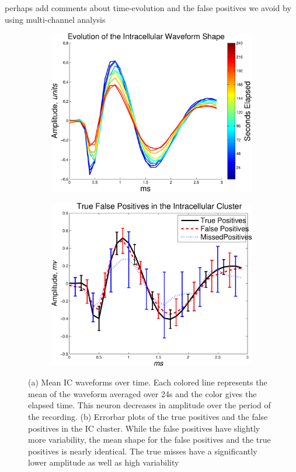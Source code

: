 {\color{red} perhaps add comments about time-evolution and the false positives we avoid by using multi-channel analysis}

\begin{center}
\begin{figure}
\begin{subfigure}[b]{.5\textwidth}
\includegraphics[width=\textwidth]{../figs/evohc1}
\caption{}
\label{evohc1}
\end{subfigure}
\begin{subfigure}[b]{.5\textwidth}
\includegraphics[width=\textwidth]{../figs/IntracellularTrueFalsePositivesv2}
\caption{}
\label{truewaveforms}
\end{subfigure}
\caption{(a) Mean IC waveforms over time.  Each colored line represents the mean of the waveform averaged over 24s and the color gives the elapsed time.  This neuron decreases in amplitude over the period of the recording. (b) Errorbar plots of the true positives and the false positives in the IC cluster.  While the false positives have slightly more variability, the mean shape for the false positives and the true positives is nearly identical.  The true misses have a significantly lower amplitude as well as high variability}
\end{figure}
\end{center}
